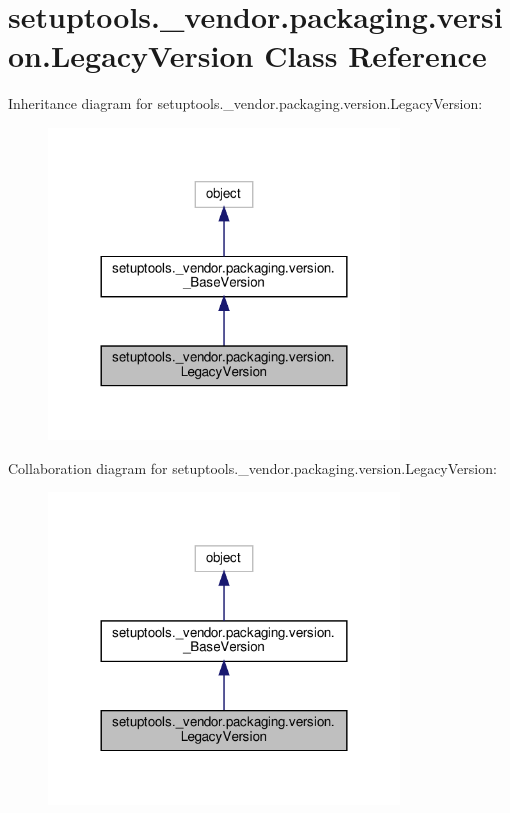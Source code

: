 \hypertarget{classsetuptools_1_1__vendor_1_1packaging_1_1version_1_1LegacyVersion}{}\section{setuptools.\+\_\+vendor.\+packaging.\+version.\+Legacy\+Version Class Reference}
\label{classsetuptools_1_1__vendor_1_1packaging_1_1version_1_1LegacyVersion}


Inheritance diagram for setuptools.\+\_\+vendor.\+packaging.\+version.\+Legacy\+Version\+:
\nopagebreak
\begin{figure}[H]
\begin{center}
\leavevmode
\includegraphics[width=264pt]{classsetuptools_1_1__vendor_1_1packaging_1_1version_1_1LegacyVersion__inherit__graph}
\end{center}
\end{figure}


Collaboration diagram for setuptools.\+\_\+vendor.\+packaging.\+version.\+Legacy\+Version\+:
\nopagebreak
\begin{figure}[H]
\begin{center}
\leavevmode
\includegraphics[width=264pt]{classsetuptools_1_1__vendor_1_1packaging_1_1version_1_1LegacyVersion__coll__graph}
\end{center}
\end{figure}

